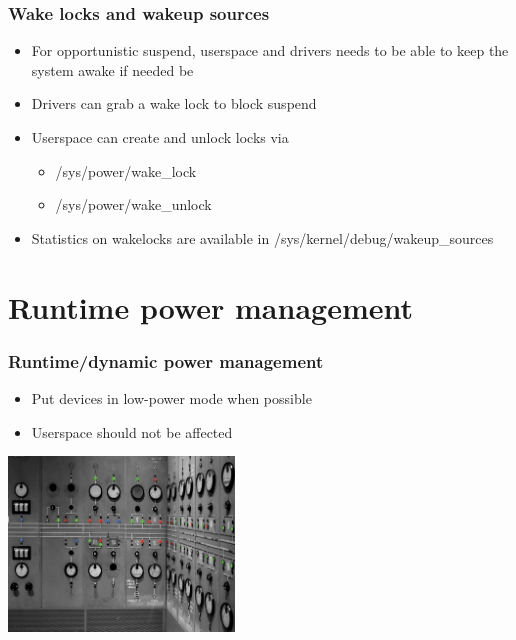 \documentclass{beamer}
\begin{document}
\begin{frame}
\frametitle{Wake locks and wakeup sources}
\begin{itemize}
	\item For opportunistic suspend, userspace and drivers needs to be able to keep the system awake if needed be
	\item Drivers can grab a wake lock to block suspend
	\item Userspace can create and unlock locks via
	\begin{itemize}
		\item /sys/power/wake\_lock 
		\item /sys/power/wake\_unlock
	\end{itemize}
	\item Statistics on wakelocks are available in /sys/kernel/debug/wakeup\_sources
\end{itemize}
\end{frame}

\section{Runtime power management}

\begin{frame}
\frametitle{Runtime/dynamic power management}

\begin{itemize}
	\item Put devices in low-power mode when possible
	\item Userspace should not be affected
\end{itemize}
\begin{center}
\includegraphics[width=6cm]{media/powerswitches.jpg}
\end{center}
\end{frame}
\end{document}
